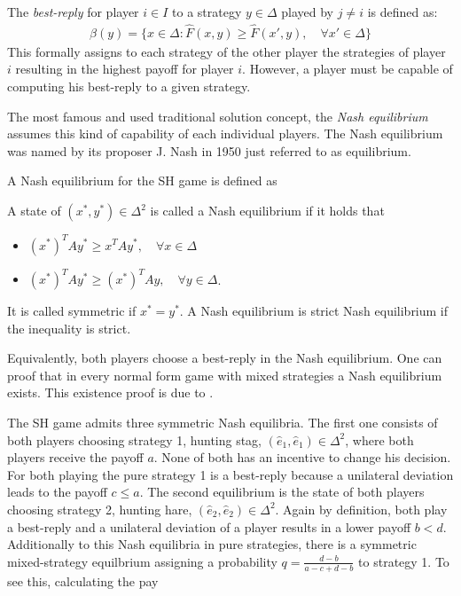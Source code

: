 \documentclass[11pt]{article}
\begin{document}
The \textit{best-reply} for player $i \in I$ to a strategy $y \in \Delta$ 
played by $j \neq i$ is defined as:
\begin{align}
        \beta(y) = \{x \in \Delta: \hat{F}(x,y) \geq \hat{F}(x',y), 
        \quad \forall x' \in \Delta\}
\end{align}
This formally assigns to each strategy of the other player the strategies
of player $i$ resulting in the highest payoff for player $i$. However, a player
must be capable of computing his best-reply to a given strategy.

The most famous and used traditional solution concept, the \textit{Nash 
equilibrium} assumes this kind of capability of each individual players. 
The Nash equilibrium was named by its proposer J. Nash in 1950 
just referred to as equilibrium.

A Nash equilibrium for the SH game is defined as
\begin{mydef}
        \label{def:nashequilibrium}
        A state of $(x^*,y^*) \in \Delta^2$ is called a Nash equilibrium if 
        it holds that
\begin{itemize}
        \item   $(x^*)^T A y^* \geq x^T A y^*, \quad \forall x \in \Delta$
        \item   $(x^*)^T A y^* \geq (x^*)^T A y, \quad \forall y \in \Delta$.
\end{itemize}
It is called symmetric if $x^* = y^*$. A Nash equilibrium is 
strict Nash equilibrium if the inequality is strict.
\end{mydef}
Equivalently, both players choose a best-reply in the Nash equilibrium.
One can proof that in every normal form game with mixed 
strategies a Nash equilibrium exists. This existence proof is due to 
\textcite{nash_equilibrium_1950}.

The SH game admits three symmetric Nash equilibria. The first one consists
of both players choosing strategy 1, hunting stag, $(\hat{e}_1,\hat{e}_1) \in
\Delta^2$, where both players receive the payoff $a$. 
None of both has an incentive to change his decision. For both
playing the pure strategy 1 is a best-reply because a unilateral deviation 
leads to the payoff $c \leq a$.
The second equilibrium is the state of 
both players choosing strategy 2, hunting hare, $(\hat{e}_2,\hat{e}_2)
\in \Delta^2$. Again by definition, both play a best-reply and a unilateral 
deviation of a player results in a lower payoff $b<d$.
Additionally to this Nash equilibria in pure strategies, there is a symmetric
mixed-strategy equilbrium assigning a probability $q=\frac{d-b}{a-c+d-b}$ to
strategy 1. To see this, calculating the pay 
\end{document}

